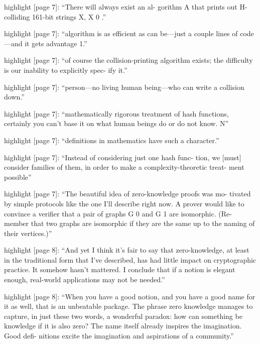 highlight {[}page 7{]}: ``There will always exist an al- gorithm A that
prints out H-colliding 161-bit strings X, X 0 .''

highlight {[}page 7{]}: ``algorithm is as efficient as can be---just a
couple lines of code---and it gets advantage 1.''

highlight {[}page 7{]}: ``of course the collision-printing algorithm
exists; the difficulty is our inability to explicitly spec- ify it.''

highlight {[}page 7{]}: ``person---no living human being---who can write
a collision down.''

highlight {[}page 7{]}: ``mathematically rigorous treatment of hash
functions, certainly you can't base it on what human beings do or do not
know. N''

highlight {[}page 7{]}: ``definitions in mathematics have such a
character.''

highlight {[}page 7{]}: ``Instead of considering just one hash func-
tion, we {[}must{]} consider families of them, in order to make a
complexity-theoretic treat- ment possible''

highlight {[}page 7{]}: ``The beautiful idea of zero-knowledge proofs
was mo- tivated by simple protocols like the one I'll describe right
now. A prover would like to convince a verifier that a pair of graphs G
0 and G 1 are isomorphic. (Re- member that two graphs are isomorphic if
they are the same up to the naming of their vertices.)''

highlight {[}page 8{]}: ``And yet I think it's fair to say that
zero-knowledge, at least in the traditional form that I've described,
has had little impact on cryptographic practice. It somehow hasn't
mattered. I conclude that if a notion is elegant enough, real-world
applications may not be needed.''

highlight {[}page 8{]}: ``When you have a good notion, and you have a
good name for it as well, that is an unbeatable package. The phrase zero
knowledge manages to capture, in just these two words, a wonderful
paradox: how can something be knowledge if it is also zero? The name
itself already inspires the imagination. Good defi- nitions excite the
imagination and aspirations of a community.''
